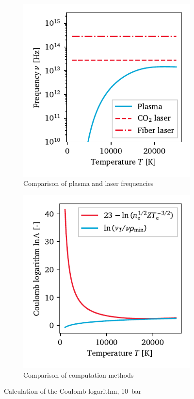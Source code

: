         \begin{figure}[h]
            \centering
            \begin{subfigure}[t]{2.9in}
                \centering
                \includegraphics[]{assets/4 models/frequency_comparison}
                \caption{Comparison of plasma and laser frequencies}
                \label{fig:coulomb_freq}
            \end{subfigure}
            \hfill
            \begin{subfigure}[t]{2.9in}
                \centering
                \includegraphics[]{assets/4 models/coulombLog}
                \caption{Comparison of computation methods}
                \label{fig:coulomb_coulomb}
            \end{subfigure}
            \caption{Calculation of the Coulomb logarithm, \qty{10}{bar}}
            \label{fig:coulomb}
        \end{figure}

